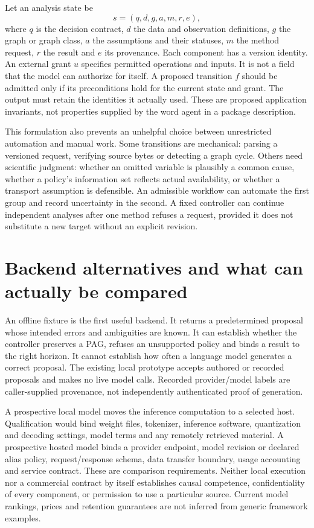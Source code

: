 Let an analysis state be
\begin{equation}
 s=(q,d,g,a,m,r,e),
 \label{exec14:l6-state}
\end{equation}
where $q$ is the decision contract, $d$ the data and observation definitions,
$g$ the graph or graph class, $a$ the assumptions and their statuses, $m$ the
method request, $r$ the result and $e$ its provenance. Each component has a
version identity. An external grant $u$ specifies permitted operations and
inputs. It is not a field that the model can authorize for itself. A proposed
transition $f$ should be admitted only if its preconditions hold for the
current state and grant. The output must retain the identities it actually
used. These are proposed application invariants, not properties supplied by
the word agent in a package description. \citep{exec14_l6_design}

This formulation also prevents an unhelpful choice between unrestricted
automation and manual work. Some transitions are mechanical: parsing a
versioned request, verifying source bytes or detecting a graph cycle. Others
need scientific judgment: whether an omitted variable is plausibly a common
cause, whether a policy's information set reflects actual availability, or
whether a transport assumption is defensible. An admissible workflow can
automate the first group and record uncertainty in the second. A fixed
controller can continue independent analyses after one method refuses a
request, provided it does not substitute a new target without an explicit
revision.

\section{Backend alternatives and what can actually be compared}

An offline fixture is the first useful backend. It returns a predetermined
proposal whose intended errors and ambiguities are known. It can establish
whether the controller preserves a PAG, refuses an unsupported policy and
binds a result to the right horizon. It cannot establish how often a language
model generates a correct proposal. The existing local prototype accepts
authored or recorded proposals and makes no live model calls. Recorded
provider/model labels are caller-supplied provenance, not independently
authenticated proof of generation. \citep{exec13_architecture_local,exec14_l6_local}

A prospective local model moves the inference computation to a selected
host. Qualification would bind weight files, tokenizer, inference software,
quantization and decoding settings, model terms and any remotely retrieved
material. A prospective hosted model binds a provider endpoint, model
revision or declared alias policy, request/response schema, data transfer
boundary, usage accounting and service contract. These are comparison
requirements. Neither local execution nor a commercial contract by itself
establishes causal competence, confidentiality of every component, or
permission to use a particular source. Current model rankings, prices and
retention guarantees are not inferred from generic framework examples.
\citep{exec14_l6_design}

